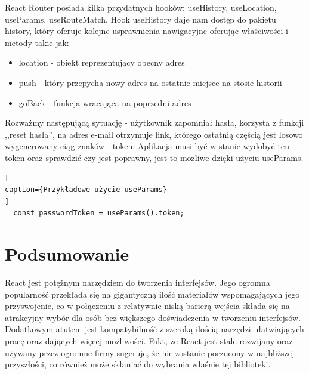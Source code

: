 \documentclass[oneside,polski,logo,indent]{amuthesis}
\begin{document}
React Router posiada kilka przydatnych hooków: useHistory, useLocation, useParams, useRouteMatch. Hook useHistory daje nam dostęp do pakietu history, który oferuje kolejne usprawnienia 
nawigacyjne oferując właściwości i metody takie jak:
\begin{itemize}
\item location - obiekt reprezentujący obecny adres
\item push - który przepycha nowy adres na ostatnie miejsce na stosie historii
\item goBack - funkcja wracająca na poprzedni adres
\end{itemize}
Rozważmy następującą sytuację - użytkownik zapomniał hasła, korzysta z funkcji ,,reset hasła'', na adres e-mail otrzymuje link, którego ostatnią częścią
jest losowo wygenerowany ciąg znaków - token. Aplikacja musi być w stanie wydobyć ten token oraz sprawdzić czy jest poprawny, jest to możliwe dzięki użyciu useParams.
\begin{lstlisting}[
caption={Przykładowe użycie useParams}
]
  const passwordToken = useParams().token;

\end{lstlisting}




\pagebreak

\section{Podsumowanie}
React jest potężnym narzędziem do tworzenia interfejsów. Jego ogromna popularność przekłada się na gigantyczną ilość materiałów wspomagających jego przyswojenie, co w połączeniu z relatywnie niską barierą wejścia składa się na atrakcyjny wybór dla osób bez większego doświadczenia w tworzeniu interfejsów.
Dodatkowym atutem jest kompatybilność z szeroką ilością narzędzi ułatwiających pracę oraz dających więcej możliwości. Fakt, że React jest stale rozwijany oraz używany przez ogromne firmy
sugeruje, że nie zostanie porzucony w najbliższej przyszłości, co również może skłaniać do wybrania właśnie tej biblioteki.

\nocite{*}


\printbibliography
\end{document}
